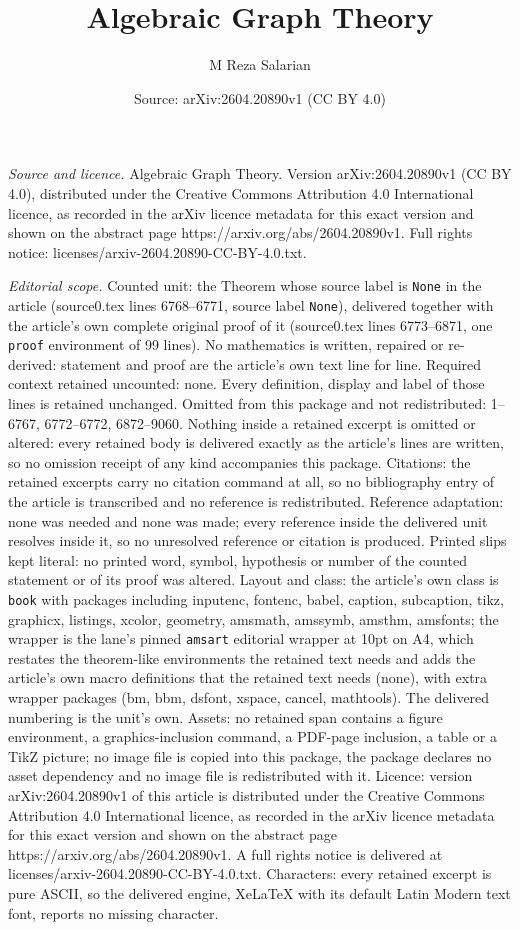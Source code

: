 \documentclass[10pt,a4paper]{amsart}
\title[Algebraic Graph Theory]{Algebraic Graph Theory}
\author{M Reza Salarian}
\date{Source: arXiv:2604.20890v1 (CC BY 4.0)}
\begin{document}
\maketitle

\noindent\emph{Source and licence.} Algebraic Graph Theory. Version arXiv:2604.20890v1 (CC BY 4.0), distributed under the Creative Commons Attribution 4.0 International licence, as recorded in the arXiv licence metadata for this exact version and shown on the abstract page https://arxiv.org/abs/2604.20890v1. Full rights notice: licenses/arxiv-2604.20890-CC-BY-4.0.txt.\par\smallskip

\noindent\textit{Editorial scope.} Counted unit: the Theorem whose source label is \texttt{None} in the article (source0.tex lines 6768--6771, source label \texttt{None}), delivered together with the article's own complete original proof of it (source0.tex lines 6773--6871, one \texttt{proof} environment of 99 lines). No mathematics is written, repaired or re-derived: statement and proof are the article's own text line for line. Required context retained uncounted: none. Every definition, display and label of those lines is retained unchanged. Omitted from this package and not redistributed: 1--6767, 6772--6772, 6872--9060. Nothing inside a retained excerpt is omitted or altered: every retained body is delivered exactly as the article's lines are written, so no omission receipt of any kind accompanies this package. Citations: the retained excerpts carry no citation command at all, so no bibliography entry of the article is transcribed and no reference is redistributed. Reference adaptation: none was needed and none was made; every reference inside the delivered unit resolves inside it, so no unresolved reference or citation is produced. Printed slips kept literal: no printed word, symbol, hypothesis or number of the counted statement or of its proof was altered. Layout and class: the article's own class is \texttt{book} with packages including inputenc, fontenc, babel, caption, subcaption, tikz, graphicx, listings, xcolor, geometry, amsmath, amssymb, amsthm, amsfonts; the wrapper is the lane's pinned \texttt{amsart} editorial wrapper at 10pt on A4, which restates the theorem-like environments the retained text needs and adds the article's own macro definitions that the retained text needs (none), with extra wrapper packages (bm, bbm, dsfont, xspace, cancel, mathtools). The delivered numbering is the unit's own. Assets: no retained span contains a figure environment, a graphics-inclusion command, a PDF-page inclusion, a table or a TikZ picture; no image file is copied into this package, the package declares no asset dependency and no image file is redistributed with it. Licence: version arXiv:2604.20890v1 of this article is distributed under the Creative Commons Attribution 4.0 International licence, as recorded in the arXiv licence metadata for this exact version and shown on the abstract page https://arxiv.org/abs/2604.20890v1. A full rights notice is delivered at licenses/arxiv-2604.20890-CC-BY-4.0.txt. Characters: every retained excerpt is pure ASCII, so the delivered engine, XeLaTeX with its default Latin Modern text font, reports no missing character.
\end{document}
